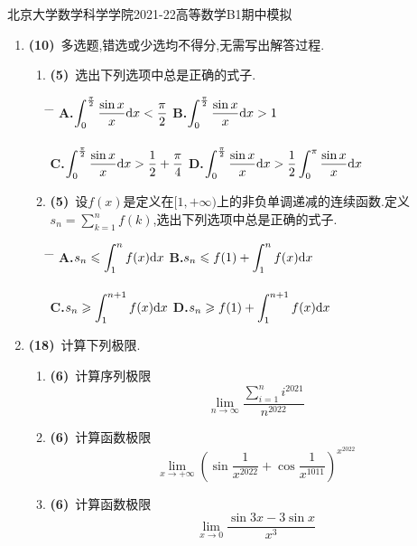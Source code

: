 \documentclass{ctexart}
\begin{document}
\pagestyle{empty}
\begin{center}\Large
    北京大学数学科学学院2021-22高等数学B1期中模拟
\end{center}
\begin{enumerate}[leftmargin=*,label=\textbf{\arabic*.},topsep=0pt,parsep=0pt,itemsep=0pt,partopsep=0pt]
    \item \textbf{(10)}\ 多选题,错选或少选均不得分,无需写出解答过程.
    \begin{enumerate}[label=\textbf{(\arabic*)}]
        \item \textbf{(5)}\ 选出下列选项中总是正确的式子.
            \begin{tabbing}
                \hspace{0pt} \= \hspace{225pt} \= \hspace{225pt} \kill
                \> \textbf{A.}$\displaystyle\int_0^{\frac{\pi}{2}}\dfrac{\sin x}{x}\mathrm{d} x<\dfrac{\pi}{2}$
                \> \textbf{B.}$\displaystyle\int_0^{\frac{\pi}{2}}\dfrac{\sin x}{x}\mathrm{d} x>1$ \\\ \\
                \> \textbf{C.}$\displaystyle\int_0^{\frac{\pi}{2}}\dfrac{\sin x}{x}\mathrm{d} x>\dfrac{1}{2}+\dfrac{\pi}{4}$
                \> \textbf{D.}$\displaystyle\int_0^{\frac{\pi}{2}}\dfrac{\sin x}{x}\mathrm{d} x>\dfrac{1}{2}\displaystyle\int_0^{\pi}\dfrac{\sin x}{x}\mathrm{d} x$
            \end{tabbing}
        \item \textbf{(5)}\ 设$f(x)$是定义在$[1,+\infty)$上的非负单调递减的连续函数.定义$\displaystyle s_n=\sum_{k=1}^nf(k)$,选出下列选项中总是正确的式子.
            \begin{tabbing}
                \hspace{0pt} \= \hspace{225pt} \= \hspace{225pt} \kill
                \> \textbf{A.}$\displaystyle s_n\leqslant\int_1^nf(x)\mathrm{d} x$
                \> \textbf{B.}$\displaystyle s_n\leqslant f(1)+\int_1^nf(x)\mathrm{d} x$ \\\ \\
                \> \textbf{C.}$\displaystyle s_n\geqslant\int_1^{n+1}f(x)\mathrm{d} x$
                \> \textbf{D.}$\displaystyle s_n\geqslant f(1)+\int_1^{n+1}f(x)\mathrm{d} x$
            \end{tabbing}
    \end{enumerate}

    \item \textbf{(18)}\ 计算下列极限.
    \begin{enumerate}[label=\textbf{(\arabic*)}]
        \item \textbf{(6)}\ 计算序列极限$$\lim_{n\to\infty}\dfrac{\sum_{i=1}^{n}i^{2021}}{n^{2022}}$$
        \item \textbf{(6)}\ 计算函数极限$$\lim_{x\to+\infty}\left(\sin\dfrac{1}{x^{2022}}+\cos\dfrac{1}{x^{1011}}\right)^{x^{2022}}$$
        \item \textbf{(6)}\ 计算函数极限$$\lim_{x\to0}\dfrac{\sin3x-3\sin x}{x^3}$$
    \end{enumerate}


\end{enumerate}
\end{document}
